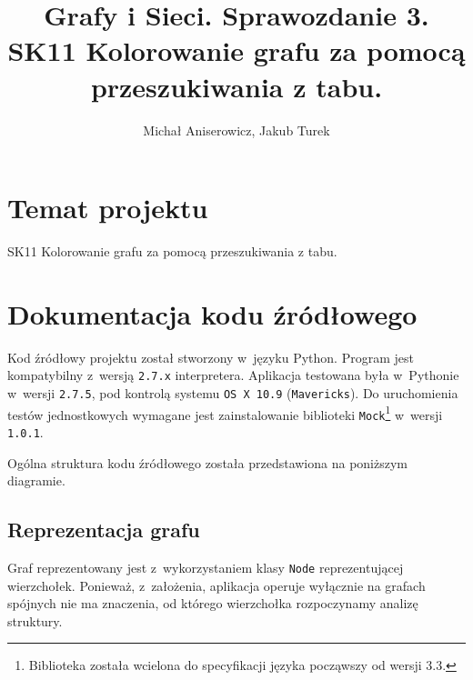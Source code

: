\documentclass[a4paper,10pt]{article}
\title{Grafy i Sieci. Sprawozdanie 3. \\ \small{SK11 Kolorowanie grafu za pomocą przeszukiwania z tabu.}}
\author{Michał Aniserowicz, Jakub Turek}
\date{}
\begin{document}
\maketitle

\section*{Temat projektu}

SK11 Kolorowanie grafu za pomocą przeszukiwania z tabu.

\section*{Dokumentacja kodu źródłowego}

Kod źródłowy projektu został stworzony w~języku Python. Program jest kompatybilny z~wersją \verb+2.7.x+ interpretera. Aplikacja testowana była w~Pythonie w~wersji \verb+2.7.5+, pod kontrolą systemu \verb+OS X 10.9+ (\verb+Mavericks+). Do uruchomienia testów jednostkowych wymagane jest zainstalowanie biblioteki \verb+Mock+\footnote{Biblioteka została wcielona do specyfikacji języka począwszy od wersji 3.3.} w~wersji \verb+1.0.1+.

Ogólna struktura kodu źródłowego została przedstawiona na poniższym diagramie.

 
\subsection*{Reprezentacja grafu}

Graf reprezentowany jest z~wykorzystaniem klasy \verb+Node+ reprezentującej wierzchołek. Ponieważ, z~założenia, aplikacja operuje wyłącznie na grafach spójnych nie ma znaczenia, od którego wierzchołka rozpoczynamy analizę struktury.
\end{document}
